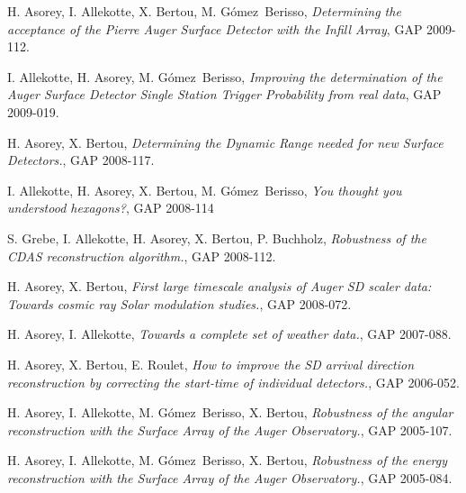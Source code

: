\begin{etaremune}
\item {}H. Asorey, I. Allekotte, X. Bertou, M. Gómez~Berisso, {\emph{Determining the acceptance of the Pierre Auger Surface Detector with the Infill Array}}, GAP 2009-112.

\item {}I. Allekotte, H. Asorey, M. Gómez~Berisso, {\emph{Improving the determination of the Auger Surface Detector Single Station Trigger Probability from real data}}, GAP 2009-019.

\item {}H. Asorey, X. Bertou, {\emph{Determining the Dynamic Range needed for new Surface Detectors.}}, GAP 2008-117.

\item {}I. Allekotte, H. Asorey, X. Bertou, M. Gómez~Berisso, {\emph{You thought you understood hexagons?}}, GAP 2008-114

\item {}S. Grebe, I. Allekotte, H. Asorey, X. Bertou, P. Buchholz, {\emph{Robustness of the CDAS reconstruction algorithm.}}, GAP 2008-112.

\item {}H. Asorey, X. Bertou, {\emph{First large timescale analysis of Auger SD scaler data: Towards cosmic ray Solar modulation studies.}}, GAP 2008-072.

\item {}H. Asorey, I. Allekotte, {\emph{Towards a complete set of weather data.}}, GAP 2007-088.

\item {}H. Asorey, X. Bertou, E. Roulet, {\emph{How to improve the SD arrival direction reconstruction by correcting the start-time of individual detectors.}}, GAP 2006-052.

\item {}H. Asorey, I. Allekotte, M. Gómez~Berisso, X. Bertou, {\emph{Robustness of the angular reconstruction with the Surface Array of the Auger Observatory.}}, GAP 2005-107.

\item {}H. Asorey, I. Allekotte, M. Gómez~Berisso, X. Bertou, {\emph{Robustness of the energy reconstruction with the Surface Array of the Auger Observatory.}}, GAP 2005-084.
\end{etaremune}
